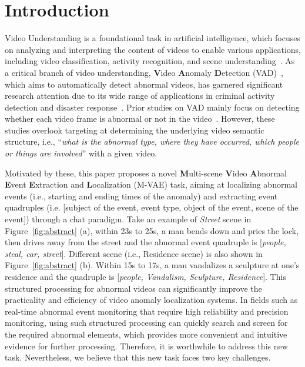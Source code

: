 
\section{Introduction}
Video Understanding is a foundational task in artificial intelligence, which focuses on analyzing and interpreting the content of videos to enable various applications, including video classification, activity recognition, and scene understanding~\cite{wu2023uniref++,videogrounding_dino,lin2023collaborative}. As a critical branch of video understanding, \textbf{V}ideo \textbf{A}nomaly \textbf{D}etection (VAD)~\cite{1}, which aims to automatically detect abnormal videos, has garnered significant research attention due to its wide range of applications in criminal activity detection and disaster response~\cite{2}. Prior studies on VAD mainly focus on detecting whether each video frame is abnormal or not in the video~\cite{3,4,1,2}. However, these studies overlook targeting at determining the underlying video semantic structure, i.e., “\emph{what is the abnormal type, where they have occurred, which people or things are involved}” with a given video. 

Motivated by these, this paper proposes a novel \textbf{M}ulti-scene \textbf{V}ideo \textbf{A}bnormal \textbf{E}vent \textbf{E}xtraction and \textbf{L}ocalization (M-VAE) task, aiming at
localizing abnormal events (i.e., starting and ending times of the anomaly) and extracting event quadruples (i.e. [subject of the event, event type, object of the event, scene of the event]) through a chat paradigm. Take an example of \emph{Street} scene in Figure~\ref{fig:abstract} (a), within 23s to 25s, a man bends down and pries the lock, then drives away from the street and the abnormal event quadruple is [\emph{people, steal, car, street}]. Different scene (i.e., Residence scene) is also shown in Figure~\ref{fig:abstract} (b). Within 15s to 17s, a man vandalizes a sculpture at 
one's residence and the quadruple is [\emph{people, Vandalism, Sculpture, Residence}].
This structured processing for abnormal videos can significantly improve the practicality and efficiency of video anomaly localization systems. In fields such as real-time abnormal event monitoring that require high reliability and precision monitoring, using such structured processing can quickly search and screen for the required abnormal elements, which provides more convenient and intuitive evidence for further processing. Therefore, it is worthwhile to address this new task. Nevertheless, we believe that this new task faces two key challenges.

